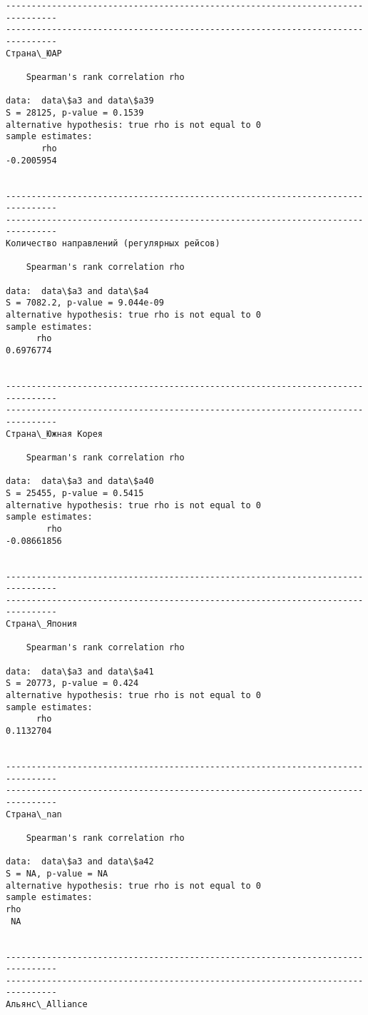 \documentclass[11pt,mathletters]{article}
\begin{document}
\begin{Verbatim}[commandchars=\\\{\}]
--------------------------------------------------------------------------------
--------------------------------------------------------------------------------
Страна\_ЮАР

	Spearman's rank correlation rho

data:  data\$a3 and data\$a39
S = 28125, p-value = 0.1539
alternative hypothesis: true rho is not equal to 0
sample estimates:
       rho 
-0.2005954 


--------------------------------------------------------------------------------
--------------------------------------------------------------------------------
Количество направлений (регулярных рейсов)

	Spearman's rank correlation rho

data:  data\$a3 and data\$a4
S = 7082.2, p-value = 9.044e-09
alternative hypothesis: true rho is not equal to 0
sample estimates:
      rho 
0.6976774 


--------------------------------------------------------------------------------
--------------------------------------------------------------------------------
Страна\_Южная Корея 

	Spearman's rank correlation rho

data:  data\$a3 and data\$a40
S = 25455, p-value = 0.5415
alternative hypothesis: true rho is not equal to 0
sample estimates:
        rho 
-0.08661856 


--------------------------------------------------------------------------------
--------------------------------------------------------------------------------
Страна\_Япония

	Spearman's rank correlation rho

data:  data\$a3 and data\$a41
S = 20773, p-value = 0.424
alternative hypothesis: true rho is not equal to 0
sample estimates:
      rho 
0.1132704 


--------------------------------------------------------------------------------
--------------------------------------------------------------------------------
Страна\_nan

	Spearman's rank correlation rho

data:  data\$a3 and data\$a42
S = NA, p-value = NA
alternative hypothesis: true rho is not equal to 0
sample estimates:
rho 
 NA 


--------------------------------------------------------------------------------
--------------------------------------------------------------------------------
Альянс\_Alliance


\end{Verbatim}
\end{document}
